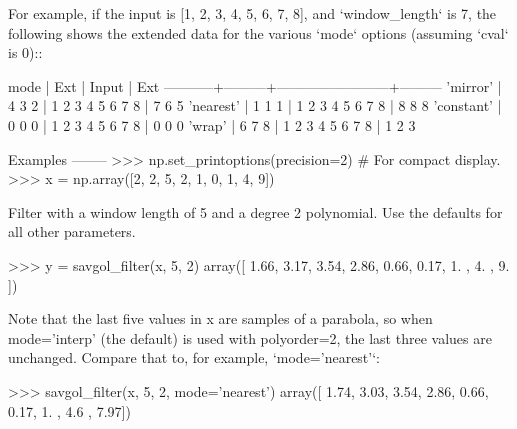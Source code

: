\begin{DoxyVerb}
For example, if the input is [1, 2, 3, 4, 5, 6, 7, 8], and
`window_length` is 7, the following shows the extended data for
the various `mode` options (assuming `cval` is 0)::

    mode       |   Ext   |         Input          |   Ext
    -----------+---------+------------------------+---------
    'mirror'   | 4  3  2 | 1  2  3  4  5  6  7  8 | 7  6  5
    'nearest'  | 1  1  1 | 1  2  3  4  5  6  7  8 | 8  8  8
    'constant' | 0  0  0 | 1  2  3  4  5  6  7  8 | 0  0  0
    'wrap'     | 6  7  8 | 1  2  3  4  5  6  7  8 | 1  2  3

Examples
--------
>>> np.set_printoptions(precision=2)  # For compact display.
>>> x = np.array([2, 2, 5, 2, 1, 0, 1, 4, 9])

Filter with a window length of 5 and a degree 2 polynomial.  Use
the defaults for all other parameters.

>>> y = savgol_filter(x, 5, 2)
array([ 1.66,  3.17,  3.54,  2.86,  0.66,  0.17,  1.  ,  4.  ,  9.  ])

Note that the last five values in x are samples of a parabola, so
when mode='interp' (the default) is used with polyorder=2, the last
three values are unchanged.  Compare that to, for example,
`mode='nearest'`:

>>> savgol_filter(x, 5, 2, mode='nearest')
array([ 1.74,  3.03,  3.54,  2.86,  0.66,  0.17,  1.  ,  4.6 ,  7.97])\end{DoxyVerb}
 